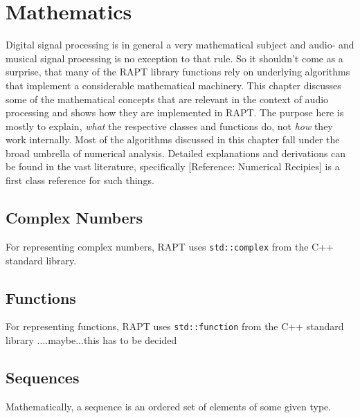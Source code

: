 \chapter{Mathematics}
Digital signal processing is in general a very mathematical subject and audio- and musical signal processing is no exception to that rule. So it shouldn't come as a surprise, that many of the RAPT library functions rely on underlying algorithms that implement a considerable mathematical machinery. This chapter discusses some of the mathematical concepts that are relevant in the context of audio processing and shows how they are implemented in RAPT. The purpose here is mostly to explain, \emph{what} the respective classes and functions do, not \emph{how} they work internally. Most of the algorithms discussed in this chapter fall under the broad umbrella of numerical analysis. 
Detailed explanations and derivations can be found in the vast literature, specifically [Reference: Numerical Recipies] is a first class reference for such things.

\section{Complex Numbers}
For representing complex numbers, RAPT uses \texttt{std::complex} from the C++ standard library.

\section{Functions}
For representing functions, RAPT uses \texttt{std::function} from the C++ standard library ....maybe...this has to be decided

\section{Sequences}
Mathematically, a sequence is an ordered set of elements of some given type.

